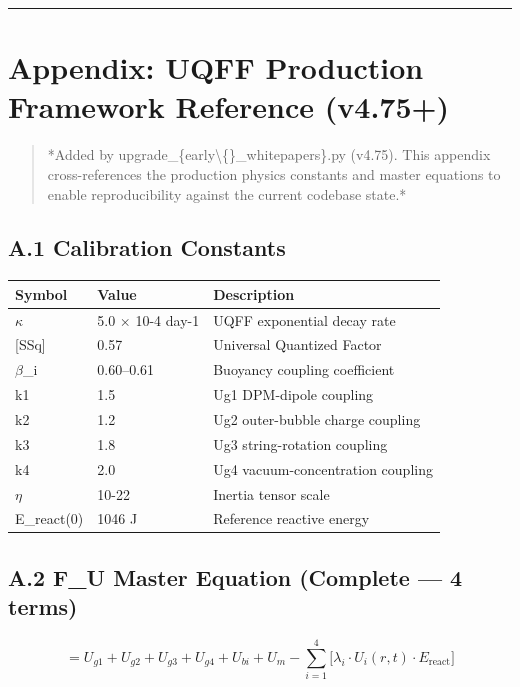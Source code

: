 \documentclass[11pt]{article}
\begin{document}
\noindent\rule{\textwidth}{0.4pt}

\section*{Appendix: UQFF Production Framework Reference (v4.75+)}

\begin{quote}
*Added by upgrade\_\{early\textbackslash\{\}\_whitepapers\}.py (v4.75). This appendix cross-references
the production physics constants and master equations to enable reproducibility
against the current codebase state.*
\end{quote}

\subsection*{A.1 Calibration Constants}

\begin{center}
\begin{longtable}{lll}
\toprule
Symbol & Value & Description \tabularnewline
\midrule
\endhead
$\kappa$ & 5.0 $\times$ 10-4 day-1 & UQFF exponential decay rate \tabularnewline
{}[SSq] & 0.57 & Universal Quantized Factor \tabularnewline
$\beta$\_i & 0.60--0.61 & Buoyancy coupling coefficient \tabularnewline
k1 & 1.5 & Ug1 DPM-dipole coupling \tabularnewline
k2 & 1.2 & Ug2 outer-bubble charge coupling \tabularnewline
k3 & 1.8 & Ug3 string-rotation coupling \tabularnewline
k4 & 2.0 & Ug4 vacuum-concentration coupling \tabularnewline
$\eta$ & 10-22 & Inertia tensor scale \tabularnewline
E\_react(0) & 1046 J & Reference reactive energy \tabularnewline
\bottomrule
\end{longtable}
\end{center}

\subsection*{A.2 F\_U Master Equation (Complete --- 4 terms)}

$$ = U_{g1} + U_{g2} + U_{g3} + U_{g4} + U_{bi} + U_m - \sum_{i=1}^{4}\bigl[\lambda_i \cdot U_i(r,t) \cdot E_{\mathrm{react}}\bigr]$$
\end{document}
